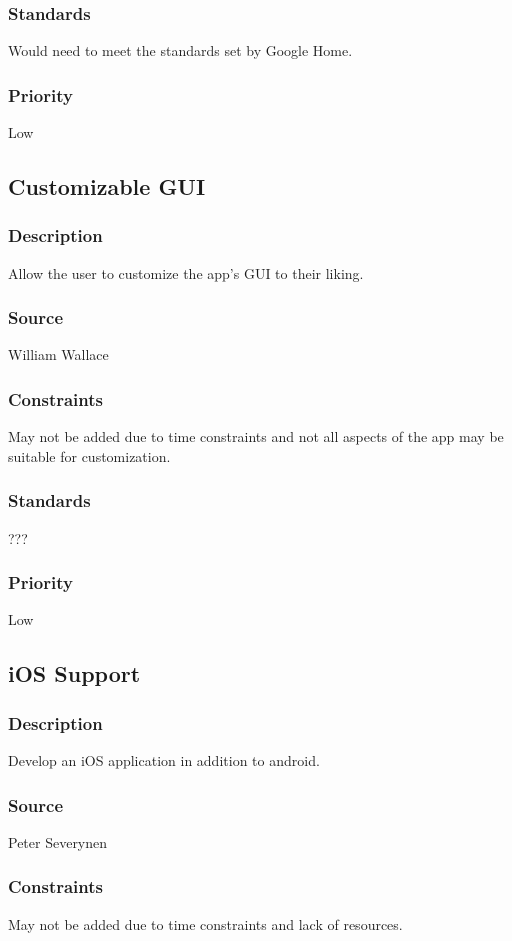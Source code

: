 \subsubsection{Standards}
Would need to meet the standards set by Google Home. 
\subsubsection{Priority}
Low
\subsection{Customizable GUI}
\subsubsection{Description}
Allow the user to customize the app's GUI to their liking.
\subsubsection{Source}
William Wallace
\subsubsection{Constraints}
May not be added due to time constraints and not all aspects of the app may be suitable for customization.
\subsubsection{Standards}
???
\subsubsection{Priority}
Low
\subsection{iOS Support}
\subsubsection{Description}
Develop an iOS application in addition to android.
\subsubsection{Source}
Peter Severynen
\subsubsection{Constraints}
May not be added due to time constraints and lack of resources.
